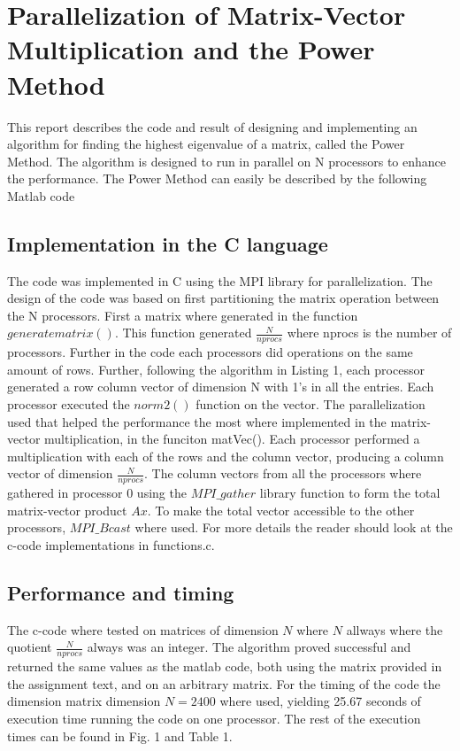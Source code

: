 \section*{Parallelization of Matrix-Vector Multiplication and the Power Method}

This report describes the code and result of designing and implementing an algorithm for finding the highest eigenvalue of a matrix, called the Power Method.  The algorithm is designed to run in parallel on N processors to enhance the performance. The Power Method  can easily be described by the following Matlab code 


\subsection*{Implementation in the C language}
The code was implemented in C using the MPI library for parallelization. The design of the code was based on first partitioning the matrix operation between the N processors. First a matrix where generated in the function $generatematrix()$. This function generated $\frac{N}{nprocs}$ where nprocs is the number of processors. Further in the code each processors did operations on the same amount of rows. Further, following the algorithm in Listing 1, each processor generated a row column vector of dimension N with 1's in all the entries. Each processor executed the $norm2()$ function on the vector. The parallelization used that helped the performance the most where implemented in the matrix-vector multiplication, in the funciton matVec(). Each processor performed a multiplication with each of the rows and the column vector, producing a column vector of dimension $\frac{N}{nprocs}$. The column vectors from all the processors where gathered in processor 0 using the $MPI\_gather$ library function to form the total matrix-vector product $Ax$. To make the total vector accessible to the other processors, $MPI\_Bcast$ where used. For more details the reader should look at the c-code implementations in functions.c.

\subsection*{Performance and timing}
The c-code where tested on matrices of dimension $N$ where $N$ allways where the quotient $\frac{N}{nprocs}$ always was an integer. The algorithm proved successful and returned the same values as the matlab code, both using the matrix provided in the assignment text, and on an arbitrary matrix. For the timing of the code the dimension matrix dimension $N=2400$ where used, yielding 25.67 seconds of execution time running the code on one processor. The rest of the execution times can be found in Fig. 1 and Table 1. 

